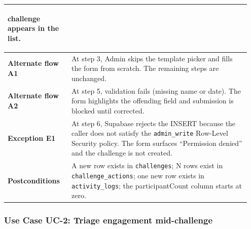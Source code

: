 \documentclass[11pt,letterpaper]{article}
\begin{document}
\begin{longtable}{p{0.25\linewidth} p{0.7\linewidth}}
\begin{enumerate}[noitemsep,leftmargin=*]
        challenge appears in the list.
\end{enumerate} \\
\midrule
\textbf{Alternate flow A1} & At step 3, Admin skips the template picker
and fills the form from scratch. The remaining steps are unchanged. \\
\textbf{Alternate flow A2} & At step 5, validation fails (missing name
or date). The form highlights the offending field and submission is
blocked until corrected. \\
\textbf{Exception E1} & At step 6, Supabase rejects the INSERT because
the caller does not satisfy the \texttt{admin\_write} Row-Level
Security policy. The form surfaces ``Permission denied'' and the
challenge is not created. \\
\textbf{Postconditions} & A new row exists in \texttt{challenges};
N rows exist in \texttt{challenge\_actions}; one new row exists in
\texttt{activity\_logs}; the participantCount column starts at zero. \\
\bottomrule
\end{longtable}

\subsubsection*{Use Case UC-2: Triage engagement mid-challenge}
\end{document}
